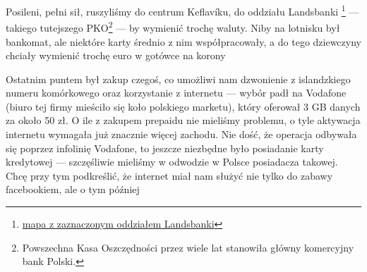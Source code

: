 

Posileni, pełni sił, ruszyliśmy do centrum Keflavíku, do oddziału Landsbanki \footnote{\href{https://www.google.com/url?q=https\%3A\%2F\%2Fmaps.google.com\%2Fmaps\%3Fq\%3D63.995522\%2C-22.548067}{mapa z zaznaczonym oddziałem Landsbanki}} --- takiego tutejszego PKO\footnote{Powszechna Kasa Oszczędności przez wiele lat stanowiła główny komercyjny bank Polski.} --- by wymienić trochę waluty. Niby na lotnisku był bankomat, ale niektóre karty średnio z nim współpracowały, a do tego dziewczyny chciały wymienić trochę euro w gotówce na korony\textellipsis


Ostatnim puntem był zakup czegoś, co umożliwi nam dzwonienie z islandzkiego numeru komórkowego oraz korzystanie z internetu --- wybór padł na Vodafone (biuro tej firmy mieściło się koło polskiego marketu), który oferował 3 GB danych za około 50 zł. O ile z zakupem prepaidu nie mieliśmy problemu, o tyle aktywacja internetu wymagała już znacznie więcej zachodu. Nie dość, że operacja odbywała się poprzez infolinię Vodafone, to jeszcze niezbędne było posiadanie karty kredytowej --- szczęśliwie mieliśmy w odwodzie w Polsce posiadacza takowej. Chcę przy tym podkreślić, że internet miał nam służyć nie tylko do zabawy facebookiem, ale o tym później\textellipsis

